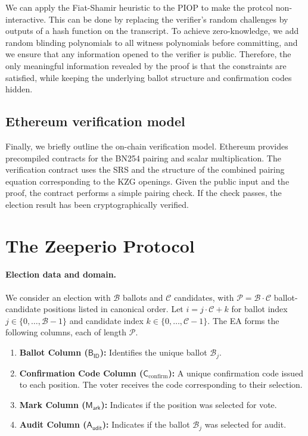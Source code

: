 We can apply the Fiat-Shamir heuristic to the PIOP to make the protcol non-interactive.
This can be done by replacing the verifier's random challenges by outputs of a hash function on the transcript.
To achieve zero-knowledge, we add random blinding polynomials to all witness polynomials before committing, and we ensure that any information opened to the verifier is public.
Therefore, the only meaningful information revealed by the proof is that the constraints are satisfied, while keeping the underlying ballot structure and confirmation codes hidden.

\subsection{Ethereum verification model}

Finally, we briefly outline the on-chain verification model.
Ethereum provides precompiled contracts for the BN254 pairing and scalar multiplication.
The verification contract uses the SRS and the structure of the combined pairing equation corresponding to the KZG openings.
Given the public input and the proof, the contract performs a simple pairing check.
If the check passes, the election result has been cryptographically verified.

\section{The Zeeperio Protocol}

\paragraph{Election data and domain.}
We consider an election with $\mathcal{B}$ ballots and $\mathcal{C}$ candidates, with $\mathcal{P}=\mathcal{B}\cdot \mathcal{C}$ ballot-candidate positions listed in canonical order. 
Let $i=j\cdot \mathcal{C}+k$ for ballot index $j\in\{0,\dots,\mathcal{B}-1\}$ and candidate index $k\in\{0,\dots,\mathcal{C}-1\}$. 
The EA forms the following columns, each of length $\mathcal{P}$.
\begin{enumerate}
    \item \textbf{Ballot Column ($\mathsf{B_{ID}}$):} Identifies the unique ballot $\mathcal{B}_j$.
    \item \textbf{Confirmation Code Column ($\mathsf{C}_\text{confirm}$):} A unique confirmation code issued to each position. The voter receives the code corresponding to their selection.
    \item \textbf{Mark Column ($\mathsf{M_{ark}}$):} Indicates if the position was selected for vote.
    \item \textbf{Audit Column ($\mathsf{A_{udit}}$):} Indicates if the ballot $\mathcal{B}_j$ was selected for audit.
\end{enumerate}

